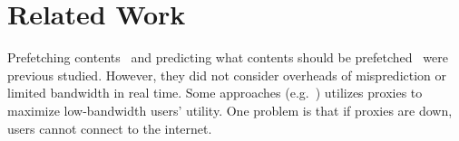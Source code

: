 \section{Related Work}
\label{sec:related}

Prefetching contents~\cite{padmanabhan1996using, jiang1998web} and predicting what contents should be prefetched~\cite{palpanas1998web, nanopoulos2003data, chen2003popularity} were previous studied. However, they did not consider overheads of misprediction or limited bandwidth in real time. Some approaches (e.g.~\cite{fan1999web}) utilizes proxies to maximize low-bandwidth users' utility. One problem is that if proxies are down, users cannot connect to the internet.
